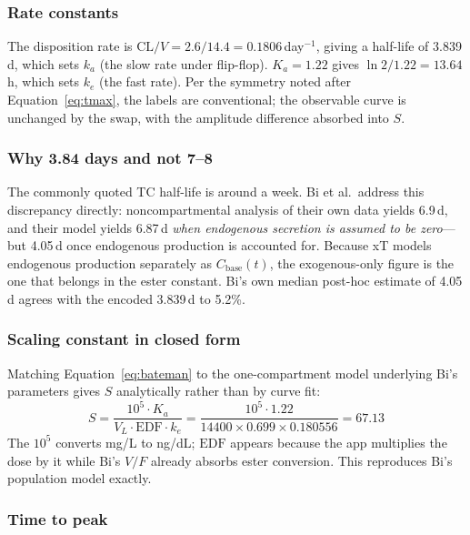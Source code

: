 \documentclass[11pt,a4paper]{article}
\begin{document}
\subsubsection{Rate constants}

The disposition rate is $\mathrm{CL}/V = 2.6/14.4 = 0.1806$\,day$^{-1}$,
giving a half-life of 3.839\,d, which sets $k_a$ (the slow rate under
flip-flop). $K_a = 1.22$ gives $\ln 2 / 1.22 = 13.64$\,h, which sets
$k_e$ (the fast rate). Per the symmetry noted after
Equation~\ref{eq:tmax}, the labels are conventional; the observable
curve is unchanged by the swap, with the amplitude difference absorbed
into $S$.

\subsubsection{Why 3.84 days and not 7--8}

The commonly quoted TC half-life is around a week. Bi et al.\ address
this discrepancy directly: noncompartmental analysis of their own data
yields 6.9\,d, and their model yields 6.87\,d \emph{when endogenous
secretion is assumed to be zero}---but 4.05\,d once endogenous production
is accounted for. Because xT models endogenous production separately as
$C_{\text{base}}(t)$, the exogenous-only figure is the one that belongs
in the ester constant. Bi's own median post-hoc estimate of 4.05\,d
agrees with the encoded 3.839\,d to 5.2\%.

\subsubsection{Scaling constant in closed form}

Matching Equation~\ref{eq:bateman} to the one-compartment model
underlying Bi's parameters gives $S$ analytically rather than by curve
fit:
\begin{equation}
S = \frac{10^5 \cdot K_a}{V_L \cdot \mathrm{EDF} \cdot k_e}
  = \frac{10^5 \cdot 1.22}{14400 \times 0.699 \times 0.180556} = 67.13
\label{eq:tcS}
\end{equation}
The $10^5$ converts mg/L to ng/dL; $\mathrm{EDF}$ appears because the
app multiplies the dose by it while Bi's $V/F$ already absorbs ester
conversion. This reproduces Bi's population model exactly.

\subsubsection{Time to peak}
\end{document}
